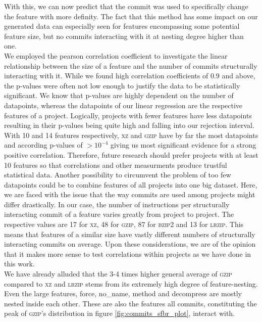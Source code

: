 With this, we can now predict that the commit was used to specifically change the feature with more definity.
The fact that this method has some impact on our generated data can especially seen for features encompassing some potential feature size, but no commits interacting with it at nesting degree higher than one.\\
We employed the pearson correlation coefficient to investigate the linear relationship between the size of a feature and the number of commits structurally interacting with it.
While we found high correlation coefficients of 0.9 and above, the p-values were often not low enough to justify the data to be statistically significant.
We know that p-values are highly dependent on the number of datapoints, whereas the datapoints of our linear regression are the respective features of a project.
Logically, projects with fewer features have less datapoints resulting in their p-values being quite high and falling into our rejection interval.
With 10 and 14 features respectively, \textsc{xz} and \textsc{gzip} have by far the most datapoints and according p-values of $>10^{-4}$ giving us most significant evidence for a strong positive correlation. 
Therefore, future research should prefer projects with at least 10 features so that correlations and other measurments produce trustful statistical data. 
Another possibility to circumvent the problem of too few datapoints could be to combine features of all projects into one big dataset.
Here, we are faced with the issue that the way commits are used among projects might differ drastically. 
In our case, the number of instructions per structurally interacting commit of a feature varies greatly from project to project.
The respective values are 17 for \textsc{xz}, 48 for \textsc{gzip}, 87 for \textsc{bzip2} and 13 for \textsc{lrzip}.
This means that features of a similar size have vastly different numbers of structurally interacting commits on average.
Upon these considerations, we are of the opinion that it makes more sense to test correlations within projects as we have done in this work.\\
We have already alluded that the 3-4 times higher general average of \textsc{gzip} compared to \textsc{xz} and \textsc{lrzip} stems from its extremely high degree of feature-nesting.
Even the large features, \textsf{force}, \textsf{no\_name}, \textsf{method} and \textsf{decompress} are mostly nested inside each other.
These are also the features all commits, constituting the peak of \textsc{gzip}'s distribution in figure \ref{fig:commits_sfbr_plot}, interact with. 
